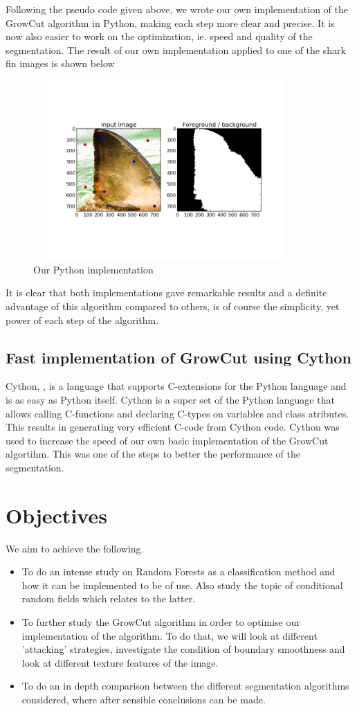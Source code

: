 \documentclass[a4paper,10pt]{article}
\begin{document}
\noindent Following the pseudo code given above, we wrote our own implementation of the GrowCut algorithm in Python, making each step more clear and precise.  It is now also easier to work on the optimization, ie. speed and quality of the segmentation.  The result of our own implementation applied to one of the shark fin images is shown below
\begin{figure}[H]
 \centering
 \includegraphics[width=4in, height=2.7in]{demo1.png}
 \caption{Our Python implementation}
\end{figure}   

\noindent  It is clear that both implementations gave remarkable results and a definite advantage of this algorithm compared to others, is of course the simplicity, yet power of each step of the algorithm. 

\subsection{Fast implementation of GrowCut using Cython}
Cython, \cite{cython}, is a language that supports C-extensions for the Python language and is as easy as Python itself.  Cython is a super set of the Python language that allows calling C-functions and declaring C-types on variables and class atributes.  This results in generating very efficient C-code from Cython code.  Cython was used to increase the speed of our own basic implementation of the GrowCut algortihm.  This was one of the steps to better the performance of the segmentation.       

\section{Objectives}
We aim to achieve the following.
\begin{itemize}
 \item To do an intense study on Random Forests as a classification method and how it can be implemented to be of use.  Also study the topic of conditional random fields which relates to the latter.
 \item To further study the GrowCut algorithm in order to optimise our implementation of the algorithm.  To do that, we will look at different 'attacking' strategies, investigate the condition of boundary smoothness and look at different texture features of the image. 
 \item To do an in depth comparison between the different segmentation algorithms considered, where after sensible conclusions can be made. 
\end{itemize}

\newpage

\end{document}
